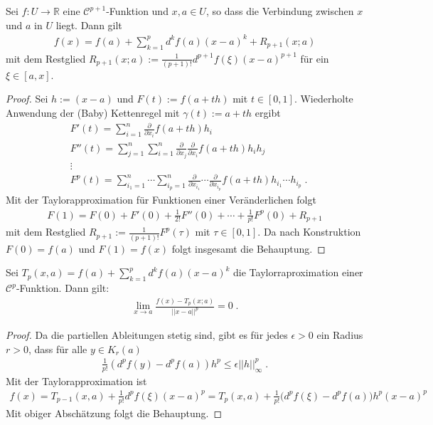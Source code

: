 \begin{Satz}[Taylorapproximation]
Sei   $f: U \to \mathbb{R}$ eine $\mathcal{C}^{p+1}$-Funktion und $x,a \in U$, so dass die Verbindung zwischen $x$ und $a$ in $U$ liegt.
Dann gilt
\begin{align*}
f(x) = f(a) + \sum_{k=1}^{p} d^k f(a) (x-a)^k + R_{p+1} (x;a)
\end{align*}
mit dem Restglied $R_{p+1} (x;a) := \frac{1}{(p+1)!} d^{p+1}f(\xi) (x-a)^{p+1}$ für ein $\xi \in [a,x]$.
\end{Satz}

\begin{proof}
Sei $h := (x-a)$ und $F(t) := f(a + th)$ mit $t \in [0,1]$. Wiederholte Anwendung der (Baby) Kettenregel mit $\gamma(t) := a +th$ ergibt
\begin{align*}
& F'(t) = \sum_{i=1}^n  \frac{\partial}{\partial x_{i}} f(a + th) h_i \\
& F''(t) =\sum_{j=1}^n \sum_{i=1}^n   \frac{\partial}{\partial x_{j}} \frac{\partial}{\partial x_{i}} f(a + th) h_i h_j \\
& \vdots \\
& F^p(t) =  \sum_{i_1=1}^n  \cdots \sum_{i_p=1}^n   \frac{\partial}{\partial x_{i_1}} \cdots \frac{\partial}{\partial x_{i_p}} f(a + th) h_{i_1} \cdots  h_{i_p}  \; .
\end{align*}
Mit der Taylorapproximation für Funktionen einer Veränderlichen folgt
\begin{align*}
 F(1) = F(0) + F'(0) + \frac{1}{2!} F''(0) + \cdots + \frac{1}{p!} F^p(0) + R_{p+1} 
\end{align*}
mit dem Restglied $ R_{p+1}  :=  \frac{1}{(p+1)!}  F^p(\tau)$ mit $\tau \in [0,1]$.
Da nach Konstruktion $F(0) = f(a)$ und $F(1)= f(x)$ folgt insgesamt die Behauptung.
\end{proof}


\begin{Satz}
Sei $T_p(x,a) =  f(a) + \sum_{k=1}^{p} d^k f(a) (x-a)^k$ die Taylorraproximation einer $\mathcal{C}^{p}$-Funktion. Dann gilt: 
\begin{align*}
\lim_{x \to a} \frac{f(x) - T_p(x;a)}{  || x-a  ||^p} = 0 \;. 
\end{align*}
\end{Satz}
\begin{proof}
Da die partiellen Ableitungen stetig sind, gibt es für jedes $\epsilon > 0$ ein Radius $r >0$, dass für alle $y \in K_r(a)$
\begin{align*}
\frac{1}{p!} (d^pf(y) -d^pf(a))h^p \leq \epsilon ||h||_{\infty}^p \; . 
\end{align*}
Mit der Taylorapproximation ist 
\begin{align*}
f(x) = T_{p-1}(x, a) +  \frac{1}{p!} d^{p}f(\xi) (x-a)^{p} = T_p(x,a) +  \frac{1}{p!} \bigl( d^pf(\xi) -d^pf(a) \bigr) h^p (x-a)^p
\end{align*} 
Mit obiger Abschätzung folgt die Behauptung.
\end{proof}

